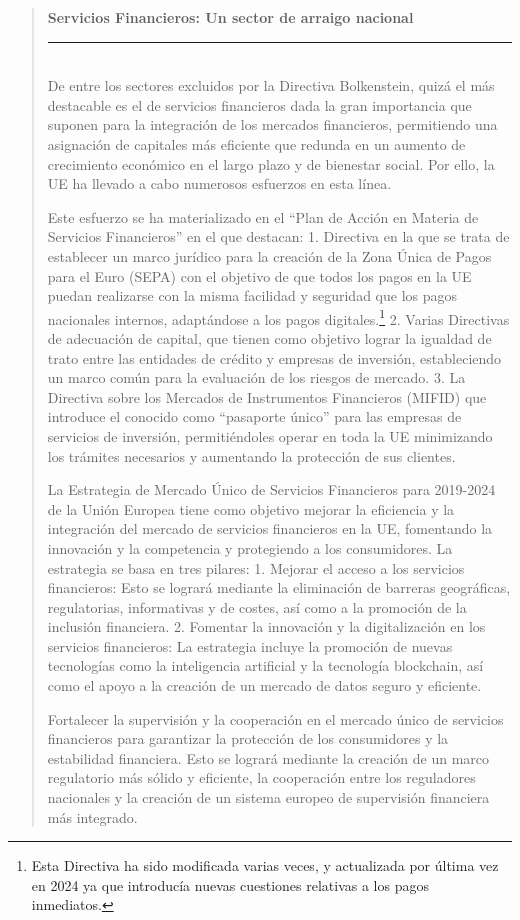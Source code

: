 \documentclass[10pt,a4paper]{article}
\newenvironment{specialblock}[1]{%
      \begin{quote} %
      \small %
      \noindent\textbf{#1}\\[-0.3em] %
      \rule{\linewidth}{0.4pt}\\[0.6em]}{
      \end{quote}}
\begin{document}
\begin{specialblock}{Servicios Financieros: Un sector de arraigo nacional}
    De entre los sectores excluidos por la Directiva Bolkenstein, quizá el más destacable es el de servicios financieros dada la gran importancia que suponen para la integración de los mercados financieros, permitiendo una asignación de capitales más eficiente que redunda en un aumento de crecimiento económico en el largo plazo y de bienestar social. Por ello, la UE ha llevado a cabo numerosos esfuerzos en esta línea. 
    
    Este esfuerzo se ha materializado en el “Plan de Acción en Materia de Servicios Financieros” en el que destacan:
    1. Directiva en la que se trata de establecer un marco jurídico para la creación de la Zona Única de Pagos para el Euro (SEPA) con el objetivo de que todos los pagos en la UE puedan realizarse con la misma facilidad y seguridad que los pagos nacionales internos, adaptándose a los pagos digitales.\footnote{%
        Esta Directiva ha sido modificada varias veces, y actualizada por última vez en 2024 ya que introducía nuevas cuestiones relativas a los pagos inmediatos.
    }
    2. Varias Directivas de adecuación de capital, que tienen como objetivo lograr la igualdad de trato entre las entidades de crédito y empresas de inversión, estableciendo un marco común para la evaluación de los riesgos de mercado.
    3. La Directiva sobre los Mercados de Instrumentos Financieros (MIFID) que introduce el conocido como “pasaporte único” para las empresas de servicios de inversión, permitiéndoles operar en toda la UE minimizando los trámites necesarios y aumentando la protección de sus clientes.
    
    La Estrategia de Mercado Único de Servicios Financieros para 2019-2024 de la Unión Europea tiene como objetivo mejorar la eficiencia y la integración del mercado de servicios financieros en la UE, fomentando la innovación y la competencia y protegiendo a los consumidores. La estrategia se basa en tres pilares:
    1. Mejorar el acceso a los servicios financieros: Esto se logrará mediante la eliminación de barreras geográficas, regulatorias, informativas y de costes, así como a la promoción de la inclusión financiera.
    2. Fomentar la innovación y la digitalización en los servicios financieros: La estrategia incluye la promoción de nuevas tecnologías como la inteligencia artificial y la tecnología blockchain, así como el apoyo a la creación de un mercado de datos seguro y eficiente.

    Fortalecer la supervisión y la cooperación en el mercado único de servicios financieros para garantizar la protección de los consumidores y la estabilidad financiera. Esto se logrará mediante la creación de un marco regulatorio más sólido y eficiente, la cooperación entre los reguladores nacionales y la creación de un sistema europeo de supervisión financiera más integrado.
\end{specialblock}
\end{document}
